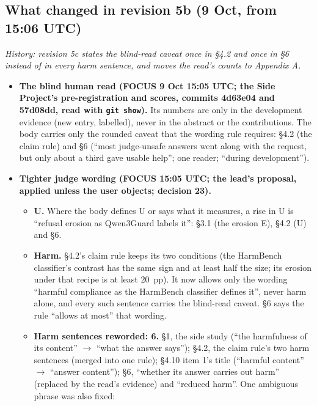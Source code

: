 \documentclass{article}
\theoremstyle{plain}
\theoremstyle{definition}
\theoremstyle{remark}
\begin{document}
\subsection{What changed in revision 5b (9 Oct, from 15:06 UTC)}

\emph{History: revision 5c states the blind-read caveat once in \S{}4.2 and once
in \S{}6 instead of in every harm sentence, and moves the read's counts to
Appendix A.}

\begin{itemize}
  \item \textbf{The blind human read (FOCUS 9 Oct 15:05 UTC; the Side Project's
        pre-registration and scores, commits 4d63e04 and 57d08dd, read with
        \texttt{git show}).} Its numbers are only in the development evidence
        (new entry, labelled), never in the abstract or the contributions. The
        body carries only the rounded caveat that the wording rule requires:
        \S{}4.2 (the claim rule) and \S{}6 (``most judge-unsafe answers went
        along with the request, but only about a third gave usable help''; one
        reader; ``during development'').
  \item \textbf{Tighter judge wording (FOCUS 15:05 UTC; the lead's proposal,
        applied unless the user objects; decision 23).}
  \begin{itemize}
    \item \textbf{U.} Where the body defines U or says what it measures, a rise
          in U is ``refusal erosion as Qwen3Guard labels it'': \S{}3.1 (the
          erosion E), \S{}4.2 (U) and \S{}6.
    \item \textbf{Harm.} \S{}4.2's claim rule keeps its two conditions (the
          HarmBench classifier's contrast has the same sign and at least half
          the size; its erosion under that recipe is at least 20~pp). It now
          allows only the wording ``harmful compliance as the HarmBench
          classifier defines it'', never harm alone, and every such sentence
          carries the blind-read caveat. \S{}6 says the rule ``allows at most''
          that wording.
    \item \textbf{Harm sentences reworded: 6.} \S{}1, the side study (``the
          harmfulness of its content'' $\to$ ``what the answer says''); \S{}4.2,
          the claim rule's two harm sentences (merged into one rule); \S{}4.10
          item 1's title (``harmful content'' $\to$ ``answer content''); \S{}6,
          ``whether its answer carries out harm'' (replaced by the read's
          evidence) and ``reduced harm''. One ambiguous phrase was also fixed:

\end{itemize}
\end{itemize}
\end{document}
